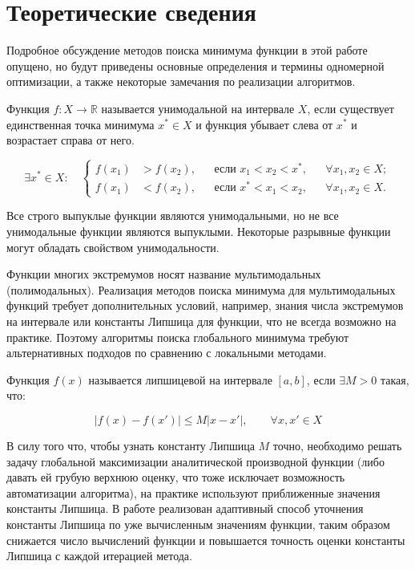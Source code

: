 \section{Теоретические сведения}
Подробное обсуждение методов поиска минимума функции в этой работе опущено,
но будут приведены основные определения и термины одномерной оптимизации, а также 
некоторые замечания по реализации алгоритмов.

\begin{definition}
Функция $f \colon X \to \mathbb{R}$ называется унимодальной на
интервале $X$, если существует единственная точка минимума
$x^* \in X$ и функция убывает слева от $x^*$ и возрастает справа от него.
\end{definition}


\begin{equation}
\exists x^* \in X:
\quad
\left\{
\begin{aligned}
    f(x_1) &> f(x_2),
    && \text{если } x_1 < x_2 < x^*,
    && \forall x_1, x_2 \in X; \\[0.3em]
    f(x_1) &< f(x_2),
    && \text{если } x^* < x_1 < x_2,
    && \forall x_1, x_2 \in X.
\end{aligned}
\right.
\end{equation}


Все строго выпуклые функции являются унимодальными, но не все унимодальные функции являются выпуклыми.
Некоторые разрывные функции могут обладать свойством унимодальности. 

Функции многих экстремумов носят название мультимодальных (полимодальных).
Реализация методов поиска минимума для мультимодальных функций требует дополнительных
условий, например, знания числа экстремумов на интервале или константы Липшица для функции, 
что не всегда возможно на практике. Поэтому алгоритмы поиска глобального
минимума требуют альтернативных подходов по сравнению с локальными методами.

\newpage

\begin{definition}
Функция $f(x)$ называется липшицевой на интервале $[a,b]$, если  $\exists M>0$ такая, что:
\end{definition}

\begin{equation}
|f(x) - f(x')| \leq M|x - x'|, \qquad \forall x, x' \in X
\end{equation}

В силу того что, чтобы узнать константу Липшица $M$ точно, необходимо решать задачу 
глобальной максимизации аналитической производной функции 
(либо давать ей грубую верхнюю оценку, что тоже исключает возможность автоматизации алгоритма),
на практике используют приближенные значения константы Липшица. В работе реализован адаптивный
способ уточнения константы Липшица по уже вычисленным значениям функции, таким образом снижается 
число вычислений функции и повышается точность оценки константы Липшица с каждой итерацией метода.

